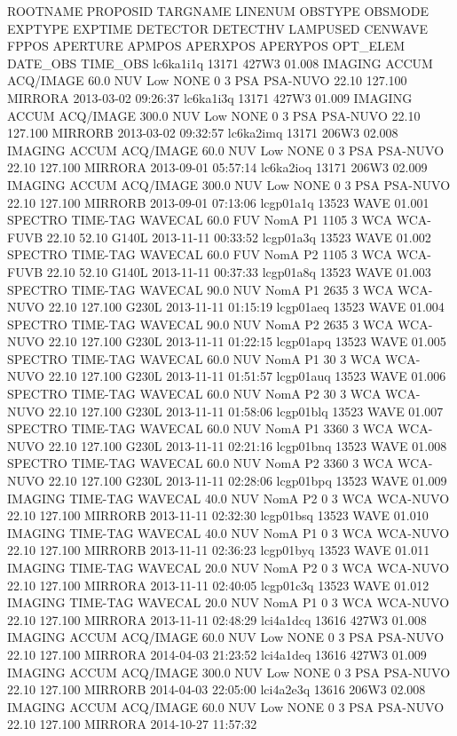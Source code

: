 ROOTNAME	PROPOSID	TARGNAME	LINENUM	OBSTYPE	OBSMODE	EXPTYPE	EXPTIME	DETECTOR	DETECTHV	LAMPUSED	CENWAVE	FPPOS	APERTURE	APMPOS	APERXPOS	APERYPOS	OPT_ELEM
DATE_OBS	TIME_OBS
lc6ka1i1q 13171 427W3 01.008 IMAGING ACCUM ACQ/IMAGE 60.0 NUV Low NONE 0 3 PSA PSA-NUVO 22.10 127.100 MIRRORA 2013-03-02 09:26:37
lc6ka1i3q 13171 427W3 01.009 IMAGING ACCUM ACQ/IMAGE 300.0 NUV Low NONE 0 3 PSA PSA-NUVO 22.10 127.100 MIRRORB 2013-03-02 09:32:57
lc6ka2imq 13171 206W3 02.008 IMAGING ACCUM ACQ/IMAGE 60.0 NUV Low NONE 0 3 PSA PSA-NUVO 22.10 127.100 MIRRORA 2013-09-01 05:57:14
lc6ka2ioq 13171 206W3 02.009 IMAGING ACCUM ACQ/IMAGE 300.0 NUV Low NONE 0 3 PSA PSA-NUVO 22.10 127.100 MIRRORB 2013-09-01 07:13:06
lcgp01a1q 13523 WAVE 01.001 SPECTRO TIME-TAG WAVECAL 60.0 FUV NomA P1 1105 3 WCA WCA-FUVB 22.10 52.10 G140L 2013-11-11 00:33:52
lcgp01a3q 13523 WAVE 01.002 SPECTRO TIME-TAG WAVECAL 60.0 FUV NomA P2 1105 3 WCA WCA-FUVB 22.10 52.10 G140L 2013-11-11 00:37:33
lcgp01a8q 13523 WAVE 01.003 SPECTRO TIME-TAG WAVECAL 90.0 NUV NomA P1 2635 3 WCA WCA-NUVO 22.10 127.100 G230L 2013-11-11 01:15:19
lcgp01aeq 13523 WAVE 01.004 SPECTRO TIME-TAG WAVECAL 90.0 NUV NomA P2 2635 3 WCA WCA-NUVO 22.10 127.100 G230L 2013-11-11 01:22:15
lcgp01apq 13523 WAVE 01.005 SPECTRO TIME-TAG WAVECAL 60.0 NUV NomA P1 30 3 WCA WCA-NUVO 22.10 127.100 G230L 2013-11-11 01:51:57
lcgp01auq 13523 WAVE 01.006 SPECTRO TIME-TAG WAVECAL 60.0 NUV NomA P2 30 3 WCA WCA-NUVO 22.10 127.100 G230L 2013-11-11 01:58:06
lcgp01blq 13523 WAVE 01.007 SPECTRO TIME-TAG WAVECAL 60.0 NUV NomA P1 3360 3 WCA WCA-NUVO 22.10 127.100 G230L 2013-11-11 02:21:16
lcgp01bnq 13523 WAVE 01.008 SPECTRO TIME-TAG WAVECAL 60.0 NUV NomA P2 3360 3 WCA WCA-NUVO 22.10 127.100 G230L 2013-11-11 02:28:06
lcgp01bpq 13523 WAVE 01.009 IMAGING TIME-TAG WAVECAL 40.0 NUV NomA P2 0 3 WCA WCA-NUVO 22.10 127.100 MIRRORB 2013-11-11 02:32:30
lcgp01bsq 13523 WAVE 01.010 IMAGING TIME-TAG WAVECAL 40.0 NUV NomA P1 0 3 WCA WCA-NUVO 22.10 127.100 MIRRORB 2013-11-11 02:36:23
lcgp01byq 13523 WAVE 01.011 IMAGING TIME-TAG WAVECAL 20.0 NUV NomA P2 0 3 WCA WCA-NUVO 22.10 127.100 MIRRORA 2013-11-11 02:40:05
lcgp01c3q 13523 WAVE 01.012 IMAGING TIME-TAG WAVECAL 20.0 NUV NomA P1 0 3 WCA WCA-NUVO 22.10 127.100 MIRRORA 2013-11-11 02:48:29
lci4a1dcq 13616 427W3 01.008 IMAGING ACCUM ACQ/IMAGE 60.0 NUV Low NONE 0 3 PSA PSA-NUVO 22.10 127.100 MIRRORA 2014-04-03 21:23:52
lci4a1deq 13616 427W3 01.009 IMAGING ACCUM ACQ/IMAGE 300.0 NUV Low NONE 0 3 PSA PSA-NUVO 22.10 127.100 MIRRORB 2014-04-03 22:05:00
lci4a2e3q 13616 206W3 02.008 IMAGING ACCUM ACQ/IMAGE 60.0 NUV Low NONE 0 3 PSA PSA-NUVO 22.10 127.100 MIRRORA 2014-10-27 11:57:32

